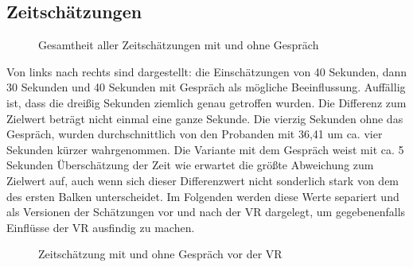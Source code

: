 \documentclass{Paper}
\begin{document}
\subsection{Zeitschätzungen}
\begin{figure}[H]
\caption{Gesamtheit aller Zeitschätzungen mit und ohne Gespräch}
\label{ZeitGespr}
\end{figure}
\par
Von links nach rechts sind dargestellt: die Einschätzungen von 40 Sekunden, dann 30 Sekunden und 40 Sekunden mit Gespräch als mögliche Beeinflussung. Auffällig ist, dass die dreißig Sekunden ziemlich genau getroffen wurden. Die Differenz zum Zielwert beträgt nicht einmal eine ganze Sekunde. Die vierzig Sekunden ohne das Gespräch, wurden durchschnittlich von den Probanden mit 36,41 um ca. vier Sekunden kürzer wahrgenommen. Die Variante mit dem Gespräch weist mit ca. 5 Sekunden Überschätzung der Zeit wie erwartet die größte Abweichung zum Zielwert auf, auch wenn sich dieser Differenzwert nicht sonderlich stark von dem des ersten Balken unterscheidet. Im Folgenden werden diese Werte separiert und als Versionen der Schätzungen vor und nach der VR dargelegt, um gegebenenfalls Einflüsse der VR ausfindig zu machen.
\begin{figure}[H]
\caption{Zeitschätzung mit und ohne Gespräch vor der VR}
\label{ZeitVorVR}
\end{figure}
\end{document}
